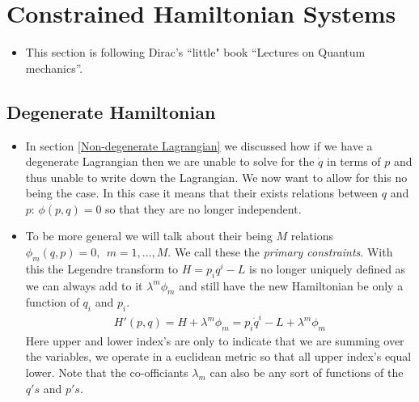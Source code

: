 \documentclass[11pt]{article}
\numberwithin{equation}{section}
\begin{document}
\begin{itemize}
\end{itemize}

\newpage 
\section{Constrained Hamiltonian Systems}
\begin{itemize}
  \item This section is following Dirac's ``little" book ``Lectures on Quantum mechanics''.
\end{itemize}

\subsection{Degenerate Hamiltonian }
\begin{itemize}
  \item In section \ref{Non-degenerate Lagrangian} we discussed how if we have a degenerate Lagrangian then we are unable to solve for the $\dot{q}$ in terms of $p$ and thus unable to write down the Lagrangian. We now want to allow for this no being the case. In this case it means that their exists relations between  $q$ and $p$: $\phi(p,q) = 0 $ so that they are no longer independent.

  \item To be more general we will talk about their being $M$ relations $\phi_{m}(q,p) = 0,~~m=1,\ldots,M$. We call these the \emph{primary constraints}. With this the Legendre transform to $H = p_iq^i-L$ is no longer uniquely defined as we can always add to it $\lambda^{m}\phi_{m}$ and still have the new Hamiltonian be only a function of $q_{i}$ and $p_{i}$. 
  \begin{align}
  \label{Ham-const}
    H'(p,q) = H + \lambda^{m}\phi_m = p_i\dot{q}^i-L + \lambda^{m}\phi_m  
  \end{align}
  Here upper and lower index's are only to indicate that we are summing over the variables, we operate in a euclidean metric so that all upper index's equal lower. Note that the co-officiants $\lambda_{m}$ can also be any sort of functions of the $q's$ and $p's$.  
\end{itemize}
\end{document}
